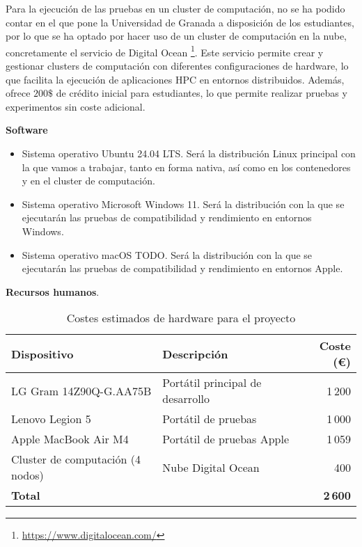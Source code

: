 Para la ejecución de las pruebas en un cluster de computación, no se ha podido contar en el que pone la Universidad de Granada a disposición de los estudiantes, por lo que se ha optado por hacer uso de un cluster de computación en la nube, concretamente el servicio de Digital Ocean \footnote{\url{https://www.digitalocean.com/}}. Este servicio permite crear y gestionar clusters de computación con diferentes configuraciones de hardware, lo que facilita la ejecución de aplicaciones HPC en entornos distribuidos. Además, ofrece $200\$$ de crédito inicial para estudiantes, lo que permite realizar pruebas y experimentos sin coste adicional.

\textbf{Software}

\begin{itemize}
    \item Sistema operativo Ubuntu 24.04 LTS. Será la distribución Linux principal con la que vamos a trabajar, tanto en forma nativa, así como en los contenedores y en el cluster de computación.

    \item Sistema operativo Microsoft Windows 11. Será la distribución con la que se ejecutarán las pruebas de compatibilidad y rendimiento en entornos Windows.

    \item Sistema operativo macOS {TODO}. Será la distribución con la que se ejecutarán las pruebas de compatibilidad y rendimiento en entornos Apple.
\end{itemize}

\textbf{Recursos humanos}.

\begin{table}[!ht]
    \centering
    \begin{tabular}{|l|l|r|}
        \hline
        \textbf{Dispositivo}             & \textbf{Descripción}             & \textbf{Coste (€)} \\
        \hline
        LG Gram 14Z90Q-G.AA75B           & Portátil principal de desarrollo & 1\,200             \\
        Lenovo Legion 5                  & Portátil de pruebas              & 1\,000             \\
        Apple MacBook Air M4             & Portátil de pruebas Apple        & 1\,059             \\
        Cluster de computación (4 nodos) & Nube Digital Ocean               & 400                \\
        \hline
        \textbf{Total}                   &                                  & \textbf{2\,600}    \\
        \hline
    \end{tabular}
    \caption{Costes estimados de hardware para el proyecto}
    \label{tab:costes-hardware}
\end{table}

